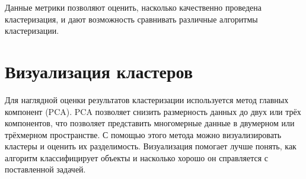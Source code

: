 Данные метрики позволяют оценить, насколько качественно проведена кластеризация, и дают возможность сравнивать различные алгоритмы кластеризации.



\section{Визуализация кластеров}

Для наглядной оценки результатов кластеризации используется метод главных компонент (PCA). PCA позволяет снизить размерность данных до двух или трёх компонентов, что позволяет представить многомерные данные в двумерном или трёхмерном пространстве. С помощью этого метода можно визуализировать кластеры и оценить их разделимость. Визуализация помогает лучше понять, как алгоритм классифицирует объекты и насколько хорошо он справляется с поставленной задачей.



\clearpage
